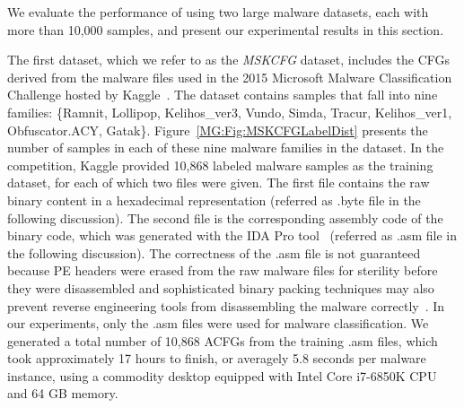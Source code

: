\label{MG:Sec:Experiment}

We evaluate the performance of \sysname using two large malware datasets, each with more than 10,000 samples, and present our experimental results in this section.

The first dataset, which we refer to as the \textit{MSKCFG} dataset, includes the CFGs derived from the malware files used in the 2015 Microsoft Malware Classification Challenge hosted by Kaggle~\cite{MsAcfgDataset}. The dataset contains samples that fall into nine families: \{Ramnit, Lollipop, Kelihos\_ver3, Vundo, Simda, Tracur, Kelihos\_ver1, Obfuscator.ACY, Gatak\}.
Figure~\ref{MG:Fig:MSKCFGLabelDist} presents the number of samples in each of these nine malware families in the dataset.
In the competition, Kaggle provided 10,868 labeled malware samples as the training dataset, for each of which two files were given.
The first file contains the raw binary content in a hexadecimal representation (referred as .byte file in the following discussion).
The second file is the corresponding assembly code of the binary code, which was generated with the IDA Pro tool~\cite{bib:idapro} (referred as .asm file in the following discussion).
The correctness of the .asm file is not guaranteed because PE headers were erased from the raw malware files for sterility before they were disassembled and sophisticated binary packing techniques may also prevent reverse engineering tools from disassembling the malware correctly~\cite{BinaryUnpacking}. 
In our experiments, only the .asm files were used for malware classification.
We generated a total number of 10,868 ACFGs from the training .asm files, which took approximately 17 hours to finish, or averagely 5.8 seconds per malware instance,
using a commodity desktop equipped with Intel Core i7-6850K CPU and 64 GB memory.

